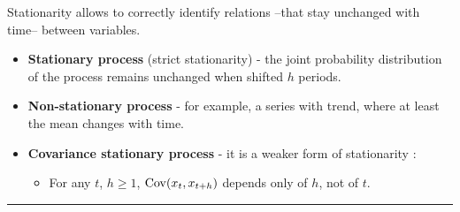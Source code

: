   \begin{f}[Stationarity]

Stationarity allows to correctly identify relations --that stay unchanged with time-- between variables.

\begin{itemize}[leftmargin=*]
	\item \textbf{Stationary process} (strict stationarity) - the joint probability distribution of the process remains unchanged when shifted $h$ periods.
	\item \textbf{Non-stationary process} - for example, a series with trend, where at least the mean changes with time.
	\item \textbf{Covariance stationary process} - it is a weaker form of stationarity :
	
	\begin{itemize}[leftmargin=*]
		
		\item For any $t$, $h \geq 1$, $\mathrm{Cov}(x_{t}, x_{t + h})$ depends only of $h$, not of $t$.
	\end{itemize}
\end{itemize}

\end{f}  \hrule

